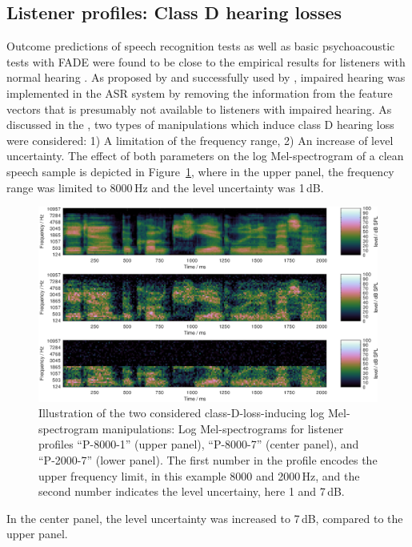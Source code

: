 \documentclass[10pt,a4paper,twocolumn]{article}
\begin{document}
\subsection*{Listener profiles: Class D hearing losses}
\label{sec:listenerprofiles}
%
Outcome predictions of speech recognition tests as well as basic psychoacoustic tests with FADE were found to be close to the empirical results for listeners with normal hearing \citep{schaedler2016a}.
%
As proposed by \cite{kollmeier2016} and successfully used by \cite{schaedler2020a}, impaired hearing was implemented in the ASR system by removing the information from the feature vectors that is presumably not available to listeners with impaired hearing.
%
As discussed in the , two types of manipulations which induce class D hearing loss were considered: 1) A limitation of the frequency range, 2) An increase of level uncertainty.
%
The effect of both parameters on the log Mel-spectrogram of a clean speech sample is depicted in Figure~\ref{fig:4}, where in the upper panel, the frequency range was limited to 8000\,Hz and the level uncertainty was 1\,dB.
%
\begin{figure}[h]
	\centerline{\includegraphics[width=1.0\textwidth]{images/leveluncertainty-bandwidth}}
	\caption{Illustration of the two considered class-D-loss-inducing log Mel-spectrogram manipulations: Log Mel-spectrograms for listener profiles \enquote{P-8000-1} (upper panel), \enquote{P-8000-7} (center panel), and \enquote{P-2000-7} (lower panel).
	The first number in the profile encodes the upper frequency limit, in this example 8000 and 2000\,Hz, and the second number indicates the level uncertainy, here 1 and 7\,dB.}
	\label{fig:4}
\end{figure}
%
In the center panel, the level uncertainty was increased to 7\,dB, compared to the upper panel.
\end{document}
